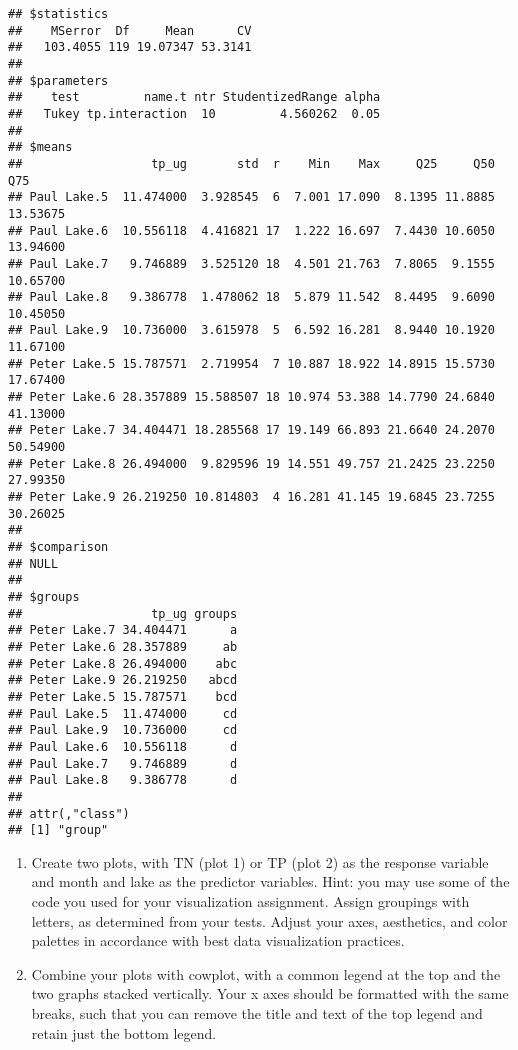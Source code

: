 \documentclass[]{article}
\begin{document}
\begin{verbatim}
## $statistics
##    MSerror  Df     Mean      CV
##   103.4055 119 19.07347 53.3141
## 
## $parameters
##    test         name.t ntr StudentizedRange alpha
##   Tukey tp.interaction  10         4.560262  0.05
## 
## $means
##                  tp_ug       std  r    Min    Max     Q25     Q50      Q75
## Paul Lake.5  11.474000  3.928545  6  7.001 17.090  8.1395 11.8885 13.53675
## Paul Lake.6  10.556118  4.416821 17  1.222 16.697  7.4430 10.6050 13.94600
## Paul Lake.7   9.746889  3.525120 18  4.501 21.763  7.8065  9.1555 10.65700
## Paul Lake.8   9.386778  1.478062 18  5.879 11.542  8.4495  9.6090 10.45050
## Paul Lake.9  10.736000  3.615978  5  6.592 16.281  8.9440 10.1920 11.67100
## Peter Lake.5 15.787571  2.719954  7 10.887 18.922 14.8915 15.5730 17.67400
## Peter Lake.6 28.357889 15.588507 18 10.974 53.388 14.7790 24.6840 41.13000
## Peter Lake.7 34.404471 18.285568 17 19.149 66.893 21.6640 24.2070 50.54900
## Peter Lake.8 26.494000  9.829596 19 14.551 49.757 21.2425 23.2250 27.99350
## Peter Lake.9 26.219250 10.814803  4 16.281 41.145 19.6845 23.7255 30.26025
## 
## $comparison
## NULL
## 
## $groups
##                  tp_ug groups
## Peter Lake.7 34.404471      a
## Peter Lake.6 28.357889     ab
## Peter Lake.8 26.494000    abc
## Peter Lake.9 26.219250   abcd
## Peter Lake.5 15.787571    bcd
## Paul Lake.5  11.474000     cd
## Paul Lake.9  10.736000     cd
## Paul Lake.6  10.556118      d
## Paul Lake.7   9.746889      d
## Paul Lake.8   9.386778      d
## 
## attr(,"class")
## [1] "group"
\end{verbatim}

\begin{enumerate}
\def\labelenumi{\arabic{enumi}.}
\setcounter{enumi}{6}
\item
  Create two plots, with TN (plot 1) or TP (plot 2) as the response
  variable and month and lake as the predictor variables. Hint: you may
  use some of the code you used for your visualization assignment.
  Assign groupings with letters, as determined from your tests. Adjust
  your axes, aesthetics, and color palettes in accordance with best data
  visualization practices.
\item
  Combine your plots with cowplot, with a common legend at the top and
  the two graphs stacked vertically. Your x axes should be formatted
  with the same breaks, such that you can remove the title and text of
  the top legend and retain just the bottom legend.
\end{enumerate}
\end{document}

